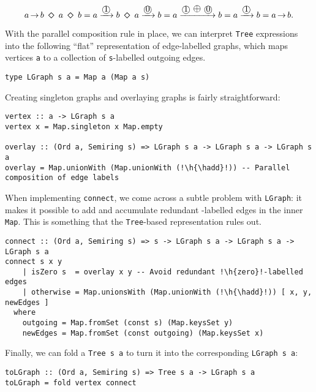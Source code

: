 \documentclass[english,submission]{programming}
\newcommand{\hcode}[1]{{\color{darkblue} \lstinline[keywordstyle={}]|#1|}} %
\newcommand{\h}[1]{{\itshape\color{grayblue}#1}} %
\newcommand{\hadd}{{\large\color{darkblue} $\oplus$}}
\newcommand{\add}{\text{\raisebox{-0.1mm}{\large $\oplus$}}}
\newcommand{\zero}{\raisebox{-0.2mm}{\textcircled{0}}\xspace}
\newcommand{\one}{\raisebox{-0.2mm}{\textcircled{1}}\xspace}
\newcommand{\dia}{\,\text{\raisebox{-0.3mm}{\Large $\diamond$}}\,}
\newcommand{\arr}{\,\text{$\rightarrow$}\,}
\begin{document}
\vspace{-5mm}
\begin{equation*}
a \arr b\ \dia\ a\ \dia\ b = a \xrightarrow{\one} b\ \dia\ a \xrightarrow{\zero} b = a \xrightarrow{\one\ \raisebox{0.15mm}{\add}\ \zero} b = a \xrightarrow{\one} b = a \arr b.
\end{equation*}
\vspace{-5mm}

\noindent
With the parallel composition rule in place, we can interpret \hcode{Tree}
expressions into the following ``flat'' representation of edge-labelled graphs,
which maps vertices \hcode{a} to a collection of \hcode{s}-labelled outgoing
edges.


\begin{lstlisting}
type LGraph s a = Map a (Map a s)
\end{lstlisting}

\noindent
Creating singleton graphs and overlaying graphs is fairly straightforward:

\begin{lstlisting}
vertex :: a -> LGraph s a
vertex x = Map.singleton x Map.empty

overlay :: (Ord a, Semiring s) => LGraph s a -> LGraph s a -> LGraph s a
overlay = Map.unionWith (Map.unionWith (!\h{\hadd}!)) -- Parallel composition of edge labels
\end{lstlisting}

\noindent
When implementing \hcode{connect}, we come across a subtle problem with
\hcode{LGraph}: it makes it possible to add and accumulate redundant
\zero-labelled edges in the inner \hcode{Map}. This is something that the
\hcode{Tree}-based representation rules out.

\begin{lstlisting}
connect :: (Ord a, Semiring s) => s -> LGraph s a -> LGraph s a -> LGraph s a
connect s x y
    | isZero s  = overlay x y -- Avoid redundant !\h{zero}!-labelled edges
    | otherwise = Map.unionsWith (Map.unionWith (!\h{\hadd}!)) [ x, y, newEdges ]
  where
    outgoing = Map.fromSet (const s) (Map.keysSet y)
    newEdges = Map.fromSet (const outgoing) (Map.keysSet x)
\end{lstlisting}

\noindent
Finally, we can fold a \hcode{Tree s a} to turn it into the corresponding
\hcode{LGraph s a}:

\begin{lstlisting}
toLGraph :: (Ord a, Semiring s) => Tree s a -> LGraph s a
toLGraph = fold vertex connect
\end{lstlisting}
\end{document}
